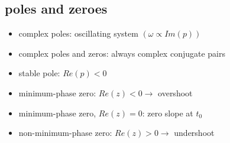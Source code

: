 \subsection{poles and zeroes}
\begin{itemize}
    \item complex poles: oscillating system $(\omega \propto Im(p))$
    \item complex poles and zeros: always complex conjugate pairs
    \item stable pole: $Re(p) < 0$
    \item minimum-phase zero: $Re(z) < 0 \rightarrow$ overshoot
    \item minimum-phase zero, $Re(z) = 0$: zero slope at $t_0$
    \item non-minimum-phase zero: $Re(z) > 0 \rightarrow$ undershoot
\end{itemize}